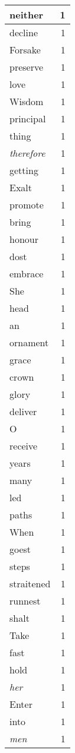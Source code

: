 \begin{center}
\begin{longtable}{l|r}
neither & 1\\ \hline 
decline & 1\\ \hline 
Forsake & 1\\ \hline 
preserve & 1\\ \hline 
love & 1\\ \hline 
Wisdom & 1\\ \hline 
principal & 1\\ \hline 
thing & 1\\ \hline 
\emph{therefore} & 1\\ \hline 
getting & 1\\ \hline 
Exalt & 1\\ \hline 
promote & 1\\ \hline 
bring & 1\\ \hline 
honour & 1\\ \hline 
dost & 1\\ \hline 
embrace & 1\\ \hline 
She & 1\\ \hline 
head & 1\\ \hline 
an & 1\\ \hline 
ornament & 1\\ \hline 
grace & 1\\ \hline 
crown & 1\\ \hline 
glory & 1\\ \hline 
deliver & 1\\ \hline 
O & 1\\ \hline 
receive & 1\\ \hline 
years & 1\\ \hline 
many & 1\\ \hline 
led & 1\\ \hline 
paths & 1\\ \hline 
When & 1\\ \hline 
goest & 1\\ \hline 
steps & 1\\ \hline 
straitened & 1\\ \hline 
runnest & 1\\ \hline 
shalt & 1\\ \hline 
Take & 1\\ \hline 
fast & 1\\ \hline 
hold & 1\\ \hline 
\emph{her} & 1\\ \hline 
Enter & 1\\ \hline 
into & 1\\ \hline 
\emph{men} & 1\\ \hline 

\end{longtable}
\end{center}
